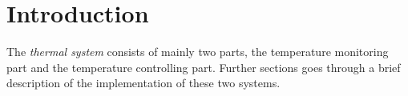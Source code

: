 \documentclass[../../main]{subfiles}
\begin{document}
\section{Introduction} \label{sec:}

The \emph{thermal system} consists of mainly two parts, the temperature monitoring part and the
temperature controlling part. Further sections goes through a brief description of the implementation
of these two systems.
\end{document}

